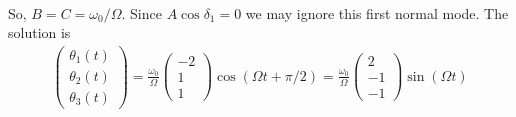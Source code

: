 \documentclass{article}
\theoremstyle{definition}
\newcommand{\f}[2]{\frac{#1}{#2}}
\begin{document}
\begin{enumerate}[label=(\alph*)]
\begin{align*}
	\end{align*}
	So, $B=C= \omega_0/\Omega$.  Since $A\cos\delta_1 = 0$ we may ignore this first normal mode. The solution is 
	\begin{align*}
	\boxed{\begin{pmatrix}
	\theta_1(t)\\
	\theta_2(t)\\
	\theta_3(t)
	\end{pmatrix}=
	\f{\omega_0}{\Omega}\begin{pmatrix}
	-2\\
	1 \\
	1
	\end{pmatrix} \cos(\Omega t + \pi/2) = \f{\omega_0}{\Omega}\begin{pmatrix}
	2\\
	-1 \\
	-1
	\end{pmatrix} \sin(\Omega t)}
	\end{align*}
	
\end{enumerate}
\end{document}
